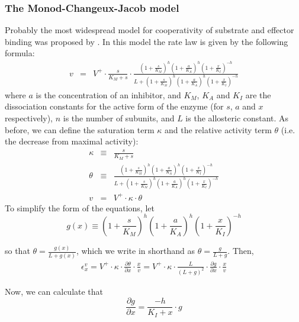 \documentclass[12pt,a4paper]{article}
\begin{document}
\subsubsection{The Monod-Changeux-Jacob model}
Probably the most widespread model for cooperativity of substrate and effector binding was proposed by \citet{Monod1965-dq}. In this model the rate law is given by the following formula:
\begin{eqnarray}
v &=& V^+ \cdot \frac{s}{K_M + s} \cdot \frac{\left(1 + \frac{s}{K_M}\right)^h \left(1 + \frac{a}{K_A}\right)^h \left(1 + \frac{x}{K_I}\right)^{-h}}{L + \left(1 + \frac{s}{K_M}\right)^h \left(1 + \frac{a}{K_A}\right)^h \left(1 + \frac{x}{K_I}\right)^{-h}}
\end{eqnarray}
where $a$ is the concentration of an inhibitor, and $K_M$, $K_A$ and $K_I$ are the dissociation constants for the active form of the enzyme (for $s$, $a$ and $x$ respectively), $n$ is the number of subunits, and $L$ is the allosteric constant. As before, we can define the saturation term $\kappa$ and the relative activity term $\theta$ (i.e. the decrease from maximal activity):
\begin{eqnarray}
\kappa &\equiv& \frac{s}{K_M + s} \nonumber\\
\theta &\equiv& \frac{\left(1 + \frac{s}{K_M}\right)^h \left(1 + \frac{a}{K_A}\right)^h \left(1 + \frac{x}{K_I}\right)^{-h}}{L + \left(1 + \frac{s}{K_M}\right)^h \left(1 + \frac{a}{K_A}\right)^h \left(1 + \frac{x}{K_I}\right)^{-h}} \nonumber\\
v &=& V^+ \cdot \kappa \cdot \theta
\end{eqnarray}
To simplify the form of the equations, let 
\begin{equation}
g(x) \equiv \left(1 + \frac{s}{K_M}\right)^h \left(1 + \frac{a}{K_A}\right)^h \left(1 + \frac{x}{K_I}\right)^{-h}
\end{equation}

\noindent so that $\theta = \frac{g(x)}{L + g(x)}$, which we write in shorthand as $\theta= \frac{g}{L+g}$. Then, 
\begin{eqnarray}
\epsilon_x^v = V^+ \cdot \kappa \cdot \frac{\partial\theta}{\partial x} \cdot \frac{x}{v} 
= V^+ \cdot \kappa \cdot \frac{L}{(L+g)^2} \cdot \frac{\partial g}{\partial x} \cdot \frac{x}{v}
\end{eqnarray}

Now, we can calculate that 
\begin{equation}
\frac{\partial g}{\partial x} = \frac{-h}{K_I + x} \cdot g
\end{equation}
\end{document}
